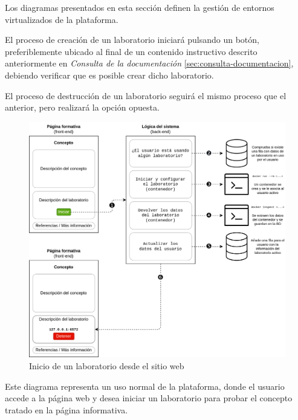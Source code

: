             Los diagramas presentados en esta sección definen la gestión de entornos virtualizados de la plataforma.
            
            El proceso de creación de un laboratorio iniciará pulsando un botón, preferiblemente ubicado al final de un contenido instructivo descrito anteriormente en \textit{Consulta de la documentación} \ref{sec:consulta-documentacion}, debiendo verificar que es posible crear dicho laboratorio.
            
            El proceso de destrucción de un laboratorio seguirá el mismo proceso que el anterior, pero realizará la opción opuesta.

            \newpage

            \begin{figure}[h]
                \centering

                \includegraphics[scale=0.125]{images/Diagramas/iniciar.png}

                \caption{Inicio de un laboratorio desde el sitio web}
                    \label{fig:inicio-laboratorio}
            \end{figure}

            Este diagrama representa un uso normal de la plataforma, donde el usuario accede a la página web y desea iniciar un laboratorio para probar el concepto tratado en la página informativa.

